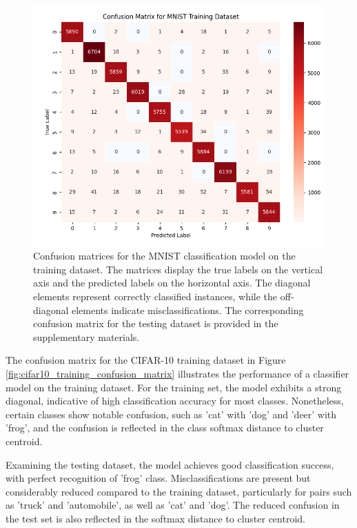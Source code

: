\begin{figure}[ht]
    \centering
    \includegraphics[width=0.99\columnwidth]{Figures/mnist_training_confusion_matrix.png}
    \caption{Confusion matrices for the MNIST classification model on the training dataset. The matrices display the true labels on the vertical axis and the predicted labels on the horizontal axis. The diagonal elements represent correctly classified instances, while the off-diagonal elements indicate misclassifications. The corresponding confusion matrix for the testing dataset is provided in the supplementary materials.}
    \label{fig:mnist_training_confusion_matrix}
\end{figure}

The confusion matrix for the CIFAR-10 training dataset in Figure \ref{fig:cifar10_training_confusion_matrix} illustrates the performance of a classifier model on the training dataset. For the training set, the model exhibits a strong diagonal, indicative of high classification accuracy for most classes. Nonetheless, certain classes show notable confusion, such as 'cat' with 'dog' and 'deer' with 'frog', and the confusion is reflected in the class softmax distance to cluster centroid.

Examining the testing dataset, the model achieves good classification success, with perfect recognition of 'frog' class. Misclassifications are present but considerably reduced compared to the training dataset, particularly for pairs such as 'truck' and 'automobile', as well as 'cat' and 'dog'. The reduced confusion in the test set is also reflected in the softmax distance to cluster centroid.

